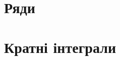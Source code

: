 \documentclass[a4paper, 12pt, oneside]{extreport}
\begin{document}


\chapter{Ряди}




% 
% 
% 
\chapter{Кратні інтеграли}
\setcounter{subsection}{9}





\setcounter{subsection}{14}


\end{document}
